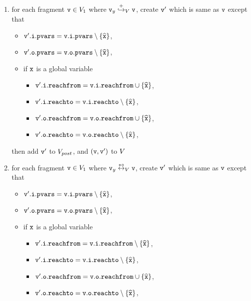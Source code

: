 \begin{enumerate}
\item for each fragment $\mathtt{v} \in V_1$ where $\mathtt{v}_y \overset{+}\hookrightarrow_{V} \mathtt{v}$, create $\mathtt{v}'$ which is same as $\mathtt{v}$ except that
\begin{itemize}
\item $\mathtt{v}'.\mathtt{i}.\mathtt{pvars} = \mathtt{v}.\mathtt{i}.\mathtt{pvars} \setminus \left\{\widehat{\mathtt{x}}\right\}$,
\item $\mathtt{v}'.\mathtt{o}.\mathtt{pvars} = \mathtt{v}.\mathtt{o}.\mathtt{pvars} \setminus \left\{\widehat{\mathtt{x}}\right\}$,
\item if $\tt x$ is a global variable
\begin{itemize}
\item $\mathtt{v}'.\mathtt{i}.\mathtt{reachfrom} = \mathtt{v}.\mathtt{i}.\mathtt{reachfrom} \cup \left\{\widehat{\mathtt{x}}\right\}$,
\item $\mathtt{v}'.\mathtt{i}.\mathtt{reachto} = \mathtt{v}.\mathtt{i}.\mathtt{reachto} \setminus \left\{\widehat{\mathtt{x}}\right\}$,
 \item $\mathtt{v}'.\mathtt{o}.\mathtt{reachfrom} = \mathtt{v}.\mathtt{o}.\mathtt{reachfrom} \cup \left\{\widehat{\mathtt{x}}\right\}$,
 \item $\mathtt{v}'.\mathtt{o}.\mathtt{reachto} = \mathtt{v}.\mathtt{o}.\mathtt{reachto} \setminus \left\{\widehat{\mathtt{x}}\right\}$,
\end{itemize}
\end{itemize}
then add $\mathtt{v}'$ to $V_{post}$, and $(\mathtt{v},\mathtt{v}')$ to $V$
\item for each fragment $\mathtt{v} \in V_1$ where $\mathtt{v}_y \overset{*\circ}\leftrightarrow_{V} \mathtt{v}$, create $\mathtt{v}'$ which is same as $\mathtt{v}$ except that
\begin{itemize}
\item $\mathtt{v}'.\mathtt{i}.\mathtt{pvars} = \mathtt{v}.\mathtt{i}.\mathtt{pvars} \setminus \left\{\widehat{\mathtt{x}}\right\}$,
\item $\mathtt{v}'.\mathtt{o}.\mathtt{pvars} = \mathtt{v}.\mathtt{o}.\mathtt{pvars} \setminus \left\{\widehat{\mathtt{x}}\right\}$,
\item if $\tt x$ is a global variable
\begin{itemize}
\item $\mathtt{v}'.\mathtt{i}.\mathtt{reachfrom} = \mathtt{v}.\mathtt{i}.\mathtt{reachfrom} \setminus \left\{\widehat{\mathtt{x}}\right\}$,
\item $\mathtt{v}'.\mathtt{i}.\mathtt{reachto} = \mathtt{v}.\mathtt{i}.\mathtt{reachto} \setminus \left\{\widehat{\mathtt{x}}\right\}$,
\item $\mathtt{v}'.\mathtt{o}.\mathtt{reachfrom} = \mathtt{v}.\mathtt{o}.\mathtt{reachfrom} \cup \left\{\widehat{\mathtt{x}}\right\}$,
\item $\mathtt{v}'.\mathtt{o}.\mathtt{reachto} = \mathtt{v}.\mathtt{o}.\mathtt{reachto} \setminus \left\{\widehat{\mathtt{x}}\right\}$,

\end{itemize}
\end{itemize}
\end{enumerate}
